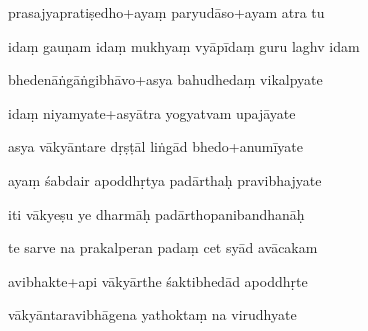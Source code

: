 \documentclass[article,12pt,a4paper]{memoir}%
\newcounter{parCount}
\begin{document}
	  
	  \pstart {} prasajyapratiṣedho+ayaṃ paryudāso+ayam atra tu 
	{}
	\pend%
      

	  
	  \pstart \leavevmode%
	idaṃ gauṇam idaṃ mukhyaṃ vyāpīdaṃ guru laghv idam 
	{}
	\pend%
      

	  
	  \pstart {} bhedenāṅgāṅgibhāvo+asya bahudhedaṃ vikalpyate 
	{}
	\pend%
      

	  
	  \pstart \leavevmode%
	idaṃ niyamyate+asyātra yogyatvam upajāyate 
	{}
	\pend%
      

	  
	  \pstart {} asya vākyāntare dṛṣṭāl liṅgād bhedo+anumīyate 
	{}
	\pend%
      

	  
	  \pstart \leavevmode%
	ayaṃ śabdair apoddhṛtya padārthaḥ pravibhajyate 
	{}
	\pend%
      

	  
	  \pstart {} iti vākyeṣu ye dharmāḥ padārthopanibandhanāḥ 
	{}
	\pend%
      

	  
	  \pstart \leavevmode%
	te sarve na prakalperan padaṃ cet syād avācakam 
	{}
	\pend%
      

	  
	  \pstart {} avibhakte+api vākyārthe śaktibhedād apoddhṛte 
	{}
	\pend%
      

	  
	  \pstart \leavevmode%
	vākyāntaravibhāgena yathoktaṃ na virudhyate 
	{}
	\pend%
      
\end{document}
